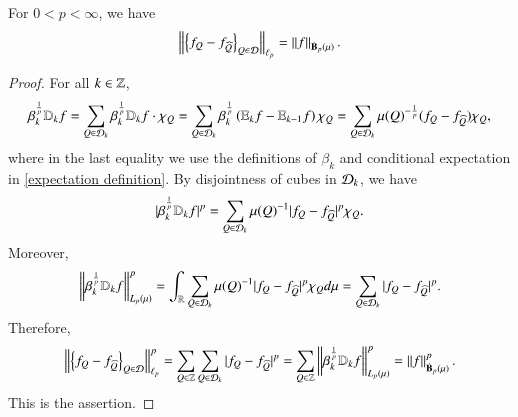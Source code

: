 \documentclass[leqno]{amsart}
\begin{document}
\begin{lemma}\label{oscillation besov}
For $0<p<\infty$, we have
\begin{align*}
\left\| \left\{ f_{Q}-f_{\widehat{Q}} \right\}_{Q\in{\mathcal D}} \right\|_{\ell_{p}}=\left\| f \right\|_{\dot{\mathbf B}_{p}(\mu)}.
\end{align*}
\end{lemma}
\begin{proof}
For all $k\in{\mathbb Z}$,
\begin{align*}
\beta_{k}^{\frac{1}{p}}\mathbb{D}_{k}f
=\sum_{Q\in{\mathcal D}_{k}}\beta_{k}^{\frac{1}{p}}\mathbb{D}_{k}f\cdot\chi_{Q}
=\sum_{Q\in{\mathcal D}_{k}}\beta_{k}^{\frac{1}{p}}\left(\mathbb E_{k}f-\mathbb E_{k-1}f\right)\chi_{Q}
=\sum_{Q\in{\mathcal D}_{k}}\mu(Q)^{-\frac{1}{p}}(f_{Q}-f_{\widehat{Q}})\chi_{Q},
\end{align*}
where in the last equality we use the definitions of $\beta_{k}$ and conditional expectation in \eqref{expectation definition}. 
By disjointness of cubes in ${\mathcal D}_{k}$, we have
\begin{align*}
|\beta_{k}^{\frac{1}{p}}\mathbb{D}_{k}f|^{p}
=\sum_{Q\in{\mathcal D}_{k}}\mu(Q)^{-1}|f_{Q}-f_{\widehat{Q}}|^{p}\chi_{Q}.
\end{align*}
Moreover,
\begin{align*}
\left\| \beta_{k}^{\frac{1}{p}}\mathbb{D}_{k}f \right\|_{L_{p}(\mu)}^{p}
=\int_{{\mathbb R}}\sum_{Q\in{\mathcal D}_{k}}\mu(Q)^{-1}|f_{Q}-f_{\widehat{Q}}|^{p}\chi_{Q}d\mu
=\sum_{Q\in{\mathcal D}_{k}}|f_{Q}-f_{\widehat{Q}}|^{p}.
\end{align*}
Therefore,
\begin{align*}
\left\| \left\{ f_{Q}-f_{\widehat{Q}} \right\}_{Q\in{\mathcal D}} \right\|_{\ell_{p}}^{p}
=\sum_{Q\in{\mathbb Z}}\sum_{Q\in{\mathcal D}_{k}}|f_{Q}-f_{\widehat{Q}}|^{p}
=\sum_{Q\in{\mathbb Z}}\left\| \beta_{k}^{\frac{1}{p}}\mathbb{D}_{k}f \right\|_{L_{p}(\mu)}^{p}
=\left\| f \right\|_{\dot{\mathbf B}_{p}(\mu)}^{p}.
\end{align*}
This is the assertion.

\end{proof}
\end{document}
